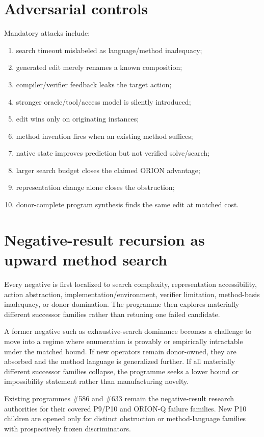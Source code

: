 \documentclass[11pt]{article}
\begin{document}
\section{Adversarial controls}
Mandatory attacks include:
\begin{enumerate}
    \item search timeout mislabeled as language/method inadequacy;
    \item generated edit merely renames a known composition;
    \item compiler/verifier feedback leaks the target action;
    \item stronger oracle/tool/access model is silently introduced;
    \item edit wins only on originating instances;
    \item method invention fires when an existing method suffices;
    \item native state improves prediction but not verified solve/search;
    \item larger search budget closes the claimed ORION advantage;
    \item representation change alone closes the obstruction;
    \item donor-complete program synthesis finds the same edit at matched cost.
\end{enumerate}

\section{Negative-result recursion as upward method search}
Every negative is first localized to search complexity, representation accessibility, action abstraction, implementation/environment, verifier limitation, method-basis inadequacy, or donor domination. The programme then explores materially different successor families rather than retuning one failed candidate.

A former negative such as exhaustive-search dominance becomes a challenge to move into a regime where enumeration is provably or empirically intractable under the matched bound. If new operators remain donor-owned, they are absorbed and the method language is generalized further. If all materially different successor families collapse, the programme seeks a lower bound or impossibility statement rather than manufacturing novelty.

Existing programmes \#586 and \#633 remain the negative-result research authorities for their covered P9/P10 and ORION-Q failure families. New P10 children are opened only for distinct obstruction or method-language families with prospectively frozen discriminators.
\end{document}
